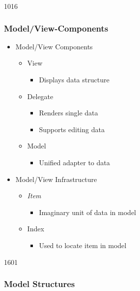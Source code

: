 \begin{slide}{1016}\frametitle{Model/View-Components}\label{model_view_concepts}
  \begin{itemize}
  \item Model/View Components
    \begin{itemize}
    \item View
      \begin{itemize}
        \item Displays data structure
      \end{itemize}
    \item Delegate
      \begin{itemize}
        \item Renders single data
        \item Supports editing data
      \end{itemize}
      \item Model
      \begin{itemize}
        \item Unified adapter to data
      \end{itemize}
    \end{itemize}
  \item Model/View Infrastructure
    \begin{itemize}
    \item \textit{Item}
      \begin{itemize}
        \item Imaginary unit of data in model
      \end{itemize}
    \item Index
      \begin{itemize}
        \item Used to locate item in model
      \end{itemize}
    \end{itemize}
  \end{itemize}
  
\smallskip
{}
  
\end{slide}

\begin{slide}{1601}\frametitle{Model Structures}
\vspace*{20mm}
\end{slide}


